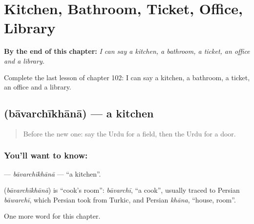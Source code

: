 
\chapter{Kitchen, Bathroom, Ticket, Office, Library}
\label{ch:ur-kitchen-bathroom-ticket-office-library}

\begin{chapteropening}
\textbf{By the end of this chapter:} \emph{I can say a kitchen, a bathroom, a ticket, an office and a library.}

Complete the last lesson of chapter 102: I can say a kitchen, a bathroom, a ticket, an office and a library.
\end{chapteropening}

\section[\texorpdfstring{\ur{باورچی} \ur{خانہ} (bāvarchīkhānā)}{باورچی خانہ (bāvarchīkhānā)}]{  (bāvarchīkhānā) — a kitchen}

\label{lesson:UR-C102-bavarchikhana}



\begin{quote}
Before the new one: say the Urdu for a field, then the Urdu for a door.
\end{quote}

\subsection*{You'll want to know:  }
\textbf{ } — \emph{bāvarchīkhānā} — \textquotedblleft{}a kitchen\textquotedblright{}.

\begin{cousinweb}
\textbf{ } (\emph{bāvarchīkhānā}) is \textquotedblleft{}cook's room\textquotedblright{}: \emph{bāvarchī}, \textquotedblleft{}a cook\textquotedblright{}, usually traced to Persian \emph{bāwarchī}, which Persian took from Turkic, and Persian \emph{khāna}, \textquotedblleft{}house, room\textquotedblright{}.
\end{cousinweb}

\begin{grammarlens}[title={What you've built}]
One more word for this chapter.
\end{grammarlens}

